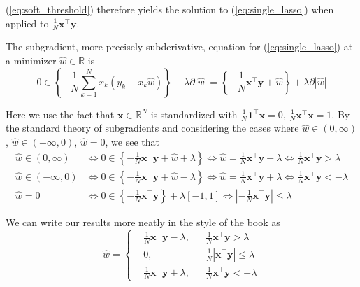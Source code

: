\documentclass{article}
\numberwithin{equation}{section}
\begin{document}
(\ref{eq:soft_threshold}) therefore yields the solution to
(\ref{eq:single_lasso}) when applied to
$ \frac{1}{N}\mathbf{x}^\top\mathbf{y} $.

 \label{sec:2.3}

The subgradient, more precisely subderivative, equation for
(\ref{eq:single_lasso}) at a minimizer $ \hat{w} \in \mathbb{R} $ is
\begin{equation} \label{eq:2.3.1}
    0 \in
    \left\{-\frac{1}{N}\sum_{k = 1}^Nx_k(y_k - x_k\hat{w})\right\} +
    \lambda\partial|\hat{w}| =
    \left\{-\frac{1}{N}\mathbf{x}^\top\mathbf{y} + \hat{w}\right\} +
    \lambda\partial|\hat{w}|
\end{equation}

Here we use the fact that $ \mathbf{x} \in \mathbb{R}^N $ is standardized
with $ \frac{1}{N}\mathbf{1}^\top\mathbf{x} = 0 $,
$ \frac{1}{N}\mathbf{x}^\top\mathbf{x} = 1 $. By the standard theory of
subgradients and considering the cases where $ \hat{w} \in (0, \infty) $,
$ \hat{w} \in(-\infty, 0) $, $ \hat{w} = 0 $, we see that
\begin{equation*}
    \begin{split}
            \hat{w} \in (0, \infty) & \Leftrightarrow
            0 \in \left\{
                -\frac{1}{N}\mathbf{x}^\top\mathbf{y} + \hat{w} + \lambda
            \right\} \Leftrightarrow
            \hat{w} = \frac{1}{N}\mathbf{x}^\top\mathbf{y} - \lambda
            \Leftrightarrow \frac{1}{N}\mathbf{x}^\top\mathbf{y} > \lambda \\
            \hat{w} \in (-\infty, 0) & \Leftrightarrow
            0 \in \left\{
                -\frac{1}{N}\mathbf{x}^\top\mathbf{y} + \hat{w} - \lambda
            \right\} \Leftrightarrow
            \hat{w} = \frac{1}{N}\mathbf{x}^\top\mathbf{y} + \lambda
            \Leftrightarrow \frac{1}{N}\mathbf{x}^\top\mathbf{y} < -\lambda \\
            \hat{w} = 0 & \Leftrightarrow
            0 \in \left\{-\frac{1}{N}\mathbf{x}^\top\mathbf{y}\right\} +
            \lambda[-1, 1] \Leftrightarrow
            \left|-\frac{1}{N}\mathbf{x}^\top\mathbf{y}\right| \le \lambda
    \end{split}
\end{equation*}

We can write our results more neatly in the style of the book as
\begin{equation} \label{eq:2.3.2}
    \hat{w} = \left\{
        \begin{aligned}
            & \frac{1}{N}\mathbf{x}^\top\mathbf{y} - \lambda,
            & & \frac{1}{N}\mathbf{x}^\top\mathbf{y} > \lambda \\
            & 0, &
            & \frac{1}{N}\left|\mathbf{x}^\top\mathbf{y}\right| \le \lambda \\
            & \frac{1}{N}\mathbf{x}^\top\mathbf{y} + \lambda,
            & & \frac{1}{N}\mathbf{x}^\top\mathbf{y} < -\lambda
        \end{aligned}
    \right.
\end{equation}
\end{document}
